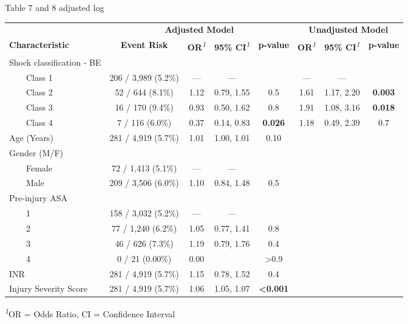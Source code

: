 \documentclass[
]{article}
\begin{document}
Table 7 and 8 adjusted log

\begin{table}[!t]
\fontsize{12.0pt}{14.4pt}\selectfont
\begin{tabular*}{\linewidth}{@{\extracolsep{\fill}}lccccccc}
\toprule
 & \multicolumn{4}{c}{\textbf{Adjusted Model}} & \multicolumn{3}{c}{\textbf{Unadjusted Model}} \\ 
\cmidrule(lr){2-5} \cmidrule(lr){6-8}
\textbf{Characteristic} & \textbf{Event Risk} & \textbf{OR}\textsuperscript{\textit{1}} & \textbf{95\% CI}\textsuperscript{\textit{1}} & \textbf{p-value} & \textbf{OR}\textsuperscript{\textit{1}} & \textbf{95\% CI}\textsuperscript{\textit{1}} & \textbf{p-value} \\ 
\midrule\addlinespace[2.5pt]
Shock classification - BE &  &  &  &  &  &  &  \\ 
    Class 1 & 206 / 3,989 (5.2\%) & — & — &  & — & — &  \\ 
    Class 2 & 52 / 644 (8.1\%) & 1.12 & 0.79, 1.55 & 0.5 & 1.61 & 1.17, 2.20 & {\bfseries 0.003} \\ 
    Class 3 & 16 / 170 (9.4\%) & 0.93 & 0.50, 1.62 & 0.8 & 1.91 & 1.08, 3.16 & {\bfseries 0.018} \\ 
    Class 4 & 7 / 116 (6.0\%) & 0.37 & 0.14, 0.83 & {\bfseries 0.026} & 1.18 & 0.49, 2.39 & 0.7 \\ 
Age (Years) & 281 / 4,919 (5.7\%) & 1.01 & 1.00, 1.01 & 0.10 &  &  &  \\ 
Gender (M/F) &  &  &  &  &  &  &  \\ 
    Female & 72 / 1,413 (5.1\%) & — & — &  &  &  &  \\ 
    Male & 209 / 3,506 (6.0\%) & 1.10 & 0.84, 1.48 & 0.5 &  &  &  \\ 
Pre-injury ASA &  &  &  &  &  &  &  \\ 
    1 & 158 / 3,032 (5.2\%) & — & — &  &  &  &  \\ 
    2 & 77 / 1,240 (6.2\%) & 1.05 & 0.77, 1.41 & 0.8 &  &  &  \\ 
    3 & 46 / 626 (7.3\%) & 1.19 & 0.79, 1.76 & 0.4 &  &  &  \\ 
    4 & 0 / 21 (0.00\%) & 0.00 &  & >0.9 &  &  &  \\ 
INR & 281 / 4,919 (5.7\%) & 1.15 & 0.78, 1.52 & 0.4 &  &  &  \\ 
Injury Severity Score & 281 / 4,919 (5.7\%) & 1.06 & 1.05, 1.07 & {\bfseries <0.001} &  &  &  \\ 
\bottomrule
\end{tabular*}
\begin{minipage}{\linewidth}
\textsuperscript{\textit{1}}OR = Odds Ratio, CI = Confidence Interval\\
\end{minipage}
\end{table}
\end{document}
